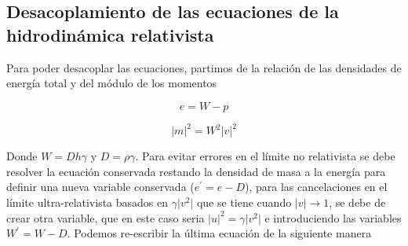 \documentclass[12pt,a4paper]{book}
\providecommand{\abs}[1]{\lvert#1\rvert} %
\begin{document}
\subsection{Desacoplamiento de las ecuaciones de la hidrodinámica relativista} \label{Cap_Desacoplamiento_de_las_ecuaciones_de_la_hidrodinámica_relativista}
Para poder desacoplar las ecuaciones, partimos de la relación de las densidades de energía total y del módulo de los momentos

\begin{equation}\label{ecuacion_de_energia}
e=W-p
\end{equation}


\begin{equation}\label{modulos de los momentos}
\abs{m}^2= W^{2}\abs{v}^{2}
\end{equation}

Donde $W=D h \gamma$ y $D=\rho \gamma$. Para evitar errores en el límite no relativista se debe resolver la ecuación conservada restando la densidad de masa 
a la energía para definir una nueva variable conservada ($e^{'}=e-D$), para las cancelaciones en el límite ultra-relativista basados en $\gamma \abs{v^2}$ que se tiene cuando $\abs{v} \rightarrow 1$, se debe de crear otra variable, que en este caso seria $\abs{u}^2=\gamma \abs{v^2}$ e introduciendo las variables $W^{'}=W-D$. Podemos re-escribir la última ecuación de la siguiente manera
\end{document}
